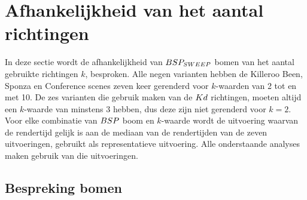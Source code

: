 \section{Afhankelijkheid van het aantal richtingen}
\label{h5-richtingen}
In deze sectie wordt de afhankelijkheid van $BSP_{SWEEP}$ bomen van het aantal gebruikte richtingen $k$, besproken. 
Alle negen varianten hebben de Killeroo Been, Sponza en Conference scenes zeven keer gerenderd voor $k$-waarden van 2 tot en met 10.
De zes varianten die gebruik maken van de $Kd$ richtingen, moeten altijd een $k$-waarde van minstens 3 hebben, dus deze zijn niet gerenderd voor $k = 2$.
Voor elke combinatie van $BSP$ boom en $k$-waarde wordt de uitvoering waarvan de rendertijd gelijk is aan de mediaan van de rendertijden van de zeven uitvoeringen, gebruikt als representatieve uitvoering.
Alle onderstaande analyses maken gebruik van die uitvoeringen.
\subsection{Bespreking bomen}
\label{h5-richtingen-bespreking}
